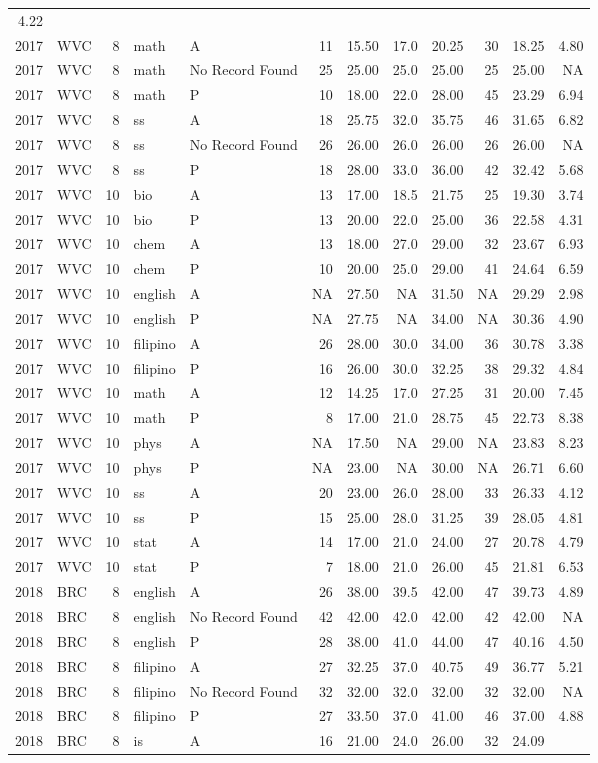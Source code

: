 \documentclass[]{article}
\begin{document}
\begin{longtable}[]{@{}rlrllrrrrrrr@{}}
4.22\tabularnewline
2017 & WVC & 8 & math & A & 11 & 15.50 & 17.0 & 20.25 & 30 & 18.25 &
4.80\tabularnewline
2017 & WVC & 8 & math & No Record Found & 25 & 25.00 & 25.0 & 25.00 & 25
& 25.00 & NA\tabularnewline
2017 & WVC & 8 & math & P & 10 & 18.00 & 22.0 & 28.00 & 45 & 23.29 &
6.94\tabularnewline
2017 & WVC & 8 & ss & A & 18 & 25.75 & 32.0 & 35.75 & 46 & 31.65 &
6.82\tabularnewline
2017 & WVC & 8 & ss & No Record Found & 26 & 26.00 & 26.0 & 26.00 & 26 &
26.00 & NA\tabularnewline
2017 & WVC & 8 & ss & P & 18 & 28.00 & 33.0 & 36.00 & 42 & 32.42 &
5.68\tabularnewline
2017 & WVC & 10 & bio & A & 13 & 17.00 & 18.5 & 21.75 & 25 & 19.30 &
3.74\tabularnewline
2017 & WVC & 10 & bio & P & 13 & 20.00 & 22.0 & 25.00 & 36 & 22.58 &
4.31\tabularnewline
2017 & WVC & 10 & chem & A & 13 & 18.00 & 27.0 & 29.00 & 32 & 23.67 &
6.93\tabularnewline
2017 & WVC & 10 & chem & P & 10 & 20.00 & 25.0 & 29.00 & 41 & 24.64 &
6.59\tabularnewline
2017 & WVC & 10 & english & A & NA & 27.50 & NA & 31.50 & NA & 29.29 &
2.98\tabularnewline
2017 & WVC & 10 & english & P & NA & 27.75 & NA & 34.00 & NA & 30.36 &
4.90\tabularnewline
2017 & WVC & 10 & filipino & A & 26 & 28.00 & 30.0 & 34.00 & 36 & 30.78
& 3.38\tabularnewline
2017 & WVC & 10 & filipino & P & 16 & 26.00 & 30.0 & 32.25 & 38 & 29.32
& 4.84\tabularnewline
2017 & WVC & 10 & math & A & 12 & 14.25 & 17.0 & 27.25 & 31 & 20.00 &
7.45\tabularnewline
2017 & WVC & 10 & math & P & 8 & 17.00 & 21.0 & 28.75 & 45 & 22.73 &
8.38\tabularnewline
2017 & WVC & 10 & phys & A & NA & 17.50 & NA & 29.00 & NA & 23.83 &
8.23\tabularnewline
2017 & WVC & 10 & phys & P & NA & 23.00 & NA & 30.00 & NA & 26.71 &
6.60\tabularnewline
2017 & WVC & 10 & ss & A & 20 & 23.00 & 26.0 & 28.00 & 33 & 26.33 &
4.12\tabularnewline
2017 & WVC & 10 & ss & P & 15 & 25.00 & 28.0 & 31.25 & 39 & 28.05 &
4.81\tabularnewline
2017 & WVC & 10 & stat & A & 14 & 17.00 & 21.0 & 24.00 & 27 & 20.78 &
4.79\tabularnewline
2017 & WVC & 10 & stat & P & 7 & 18.00 & 21.0 & 26.00 & 45 & 21.81 &
6.53\tabularnewline
2018 & BRC & 8 & english & A & 26 & 38.00 & 39.5 & 42.00 & 47 & 39.73 &
4.89\tabularnewline
2018 & BRC & 8 & english & No Record Found & 42 & 42.00 & 42.0 & 42.00 &
42 & 42.00 & NA\tabularnewline
2018 & BRC & 8 & english & P & 28 & 38.00 & 41.0 & 44.00 & 47 & 40.16 &
4.50\tabularnewline
2018 & BRC & 8 & filipino & A & 27 & 32.25 & 37.0 & 40.75 & 49 & 36.77 &
5.21\tabularnewline
2018 & BRC & 8 & filipino & No Record Found & 32 & 32.00 & 32.0 & 32.00
& 32 & 32.00 & NA\tabularnewline
2018 & BRC & 8 & filipino & P & 27 & 33.50 & 37.0 & 41.00 & 46 & 37.00 &
4.88\tabularnewline
2018 & BRC & 8 & is & A & 16 & 21.00 & 24.0 & 26.00 & 32 & 24.09 &

\end{longtable}
\end{document}

